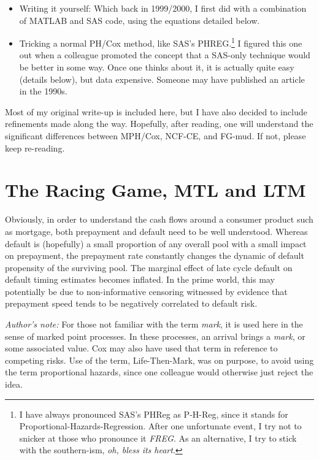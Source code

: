 \documentclass[10pt]{article}
\begin{document}
\begin{itemize}
\item Writing it yourself: Which back in 1999/2000, I first did with a combination of MATLAB and SAS code, using the equations detailed
    below.
\item Tricking a normal PH/Cox method, like SAS's PHREG.\footnote{I have always pronounced SAS's PHReg as P-H-Reg,
    since it stands for Proportional-Hazards-Regression.  After one unfortunate event, I try not to snicker at those 
        who pronounce it {\em FREG}.  As an alternative, I try to stick with the southern-ism, {\em oh, bless its heart}.
        }
I figured this one out when a colleague promoted the concept that a SAS-only technique
        would be better in some way.  Once one thinks about it, it is actually quite easy (details below), but data expensive.
Someone may have published an article in the 1990s.
\end{itemize}

Most of my original write-up is included here, but I have also decided to include refinements made along 
the way.  
Hopefully, after reading, one will understand the significant differences between MPH/Cox, NCF-CE, and FG-mud.
If not, please keep re-reading.

\section{The Racing Game, MTL and LTM}


Obviously, in order to understand the cash flows around a consumer product such as mortgage, both prepayment and default need to be well understood.
Whereas default is (hopefully) a small proportion of any overall pool with a small impact on prepayment, the prepayment rate 
constantly changes the dynamic of default propensity of the surviving pool.  
The marginal effect of late cycle default 
on default timing estimates becomes inflated. In the prime world, this may potentially be due to non-informative censoring witnessed by evidence 
that prepayment speed tends to be negatively correlated to default risk.  

{\em Author's note:}  For those not familiar with the term {\em mark}, it is used here in the sense of marked point processes. In these
processes, an arrival brings a {\em mark}, or some associated value.  Cox may also have used that term in reference to competing risks.
Use of the term, Life-Then-Mark, was on purpose, to avoid using the term proportional hazards, since one colleague would otherwise just reject the
idea.
\end{document}

